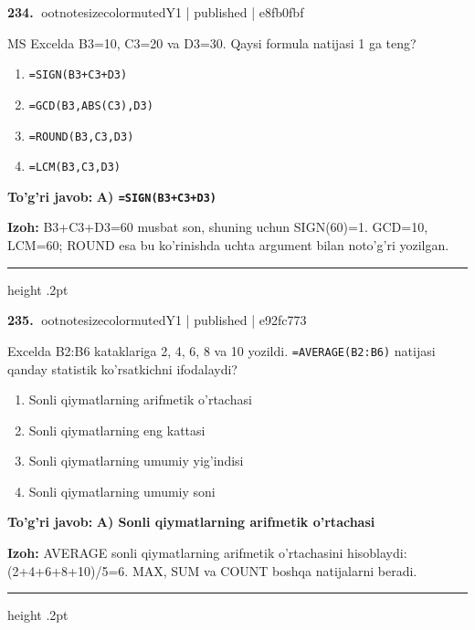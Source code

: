\documentclass[10pt,a4paper]{article}
\begin{document}
\textbf{\color{ink}234.} {ootnotesizecolor{muted}Y1 | published | e8fb0fbf}
\par
MS Excelda B3=10, C3=20 va D3=30. Qaysi formula natijasi 1 ga teng?
\begin{enumerate}[label=\Alph*),leftmargin=9mm]
\item \texttt{=SIGN(B3+C3+D3)}
\item \texttt{=GCD(B3,ABS(C3),D3)}
\item \texttt{=ROUND(B3,C3,D3)}
\item \texttt{=LCM(B3,C3,D3)}
\end{enumerate}
\begin{tcolorbox}[enhanced,breakable,colback=teal!4,colframe=teal!55!black,boxrule=0.45pt,arc=1.2mm,left=2.8mm,right=2.8mm,top=2mm,bottom=2mm]
\textbf{\color{teal}To'g'ri javob:} \textbf{A) \texttt{=SIGN(B3+C3+D3)}}
\par\smallskip
\textbf{Izoh:} B3+C3+D3=60 musbat son, shuning uchun SIGN(60)=1. GCD=10, LCM=60; ROUND esa bu ko'rinishda uchta argument bilan noto'g'ri yozilgan.
\end{tcolorbox}
\vspace{2mm}\hrule height .2pt\vspace{2mm}

\textbf{\color{ink}235.} {ootnotesizecolor{muted}Y1 | published | e92fc773}
\par
Excelda B2:B6 kataklariga 2, 4, 6, 8 va 10 yozildi. \texttt{=AVERAGE(B2:B6)} natijasi qanday statistik ko'rsatkichni ifodalaydi?
\begin{enumerate}[label=\Alph*),leftmargin=9mm]
\item Sonli qiymatlarning arifmetik o'rtachasi
\item Sonli qiymatlarning eng kattasi
\item Sonli qiymatlarning umumiy yig'indisi
\item Sonli qiymatlarning umumiy soni
\end{enumerate}
\begin{tcolorbox}[enhanced,breakable,colback=teal!4,colframe=teal!55!black,boxrule=0.45pt,arc=1.2mm,left=2.8mm,right=2.8mm,top=2mm,bottom=2mm]
\textbf{\color{teal}To'g'ri javob:} \textbf{A) Sonli qiymatlarning arifmetik o'rtachasi}
\par\smallskip
\textbf{Izoh:} AVERAGE sonli qiymatlarning arifmetik o'rtachasini hisoblaydi: (2+4+6+8+10)/5=6. MAX, SUM va COUNT boshqa natijalarni beradi.
\end{tcolorbox}
\vspace{2mm}\hrule height .2pt\vspace{2mm}
\end{document}
